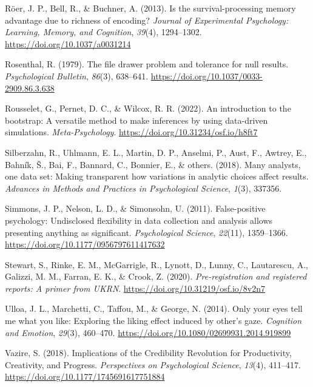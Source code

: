 \documentclass[
  man]{apa7}
\newlength{\cslhangindent}
\newlength{\cslentryspacingunit} %
\newenvironment{CSLReferences}[2] %
 {%
  \setlength{\parindent}{0pt}
  \ifodd #1
  \let\oldpar\par
  \def\par{\hangindent=\cslhangindent\oldpar}
  \fi
  \setlength{\parskip}{#2\cslentryspacingunit}
 }%
 {}
\begin{document}
\begin{CSLReferences}{1}{0}
\leavevmode{}%
Röer, J. P., Bell, R., \& Buchner, A. (2013). Is the survival-processing memory advantage due to richness of encoding? \emph{Journal of Experimental Psychology: Learning, Memory, and Cognition}, \emph{39}(4), 1294--1302. \url{https://doi.org/10.1037/a0031214}

\leavevmode{}%
Rosenthal, R. (1979). The file drawer problem and tolerance for null results. \emph{Psychological Bulletin}, \emph{86}(3), 638--641. \url{https://doi.org/10.1037/0033-2909.86.3.638}

\leavevmode{}%
Rousselet, G., Pernet, D. C., \& Wilcox, R. R. (2022). An introduction to the bootstrap: A versatile method to make inferences by using data-driven simulations. \emph{Meta-Psychology}. \url{https://doi.org/10.31234/osf.io/h8ft7}

\leavevmode{}%
Silberzahn, R., Uhlmann, E. L., Martin, D. P., Anselmi, P., Aust, F., Awtrey, E., Bahník, Š., Bai, F., Bannard, C., Bonnier, E., \& others. (2018). Many analysts, one data set: Making transparent how variations in analytic choices affect results. \emph{Advances in Methods and Practices in Psychological Science}, \emph{1}(3), 337356.

\leavevmode{}%
Simmons, J. P., Nelson, L. D., \& Simonsohn, U. (2011). False-positive psychology: Undisclosed flexibility in data collection and analysis allows presenting anything as significant. \emph{Psychological Science}, \emph{22}(11), 1359--1366. \url{https://doi.org/10.1177/0956797611417632}

\leavevmode{}%
Stewart, S., Rinke, E. M., McGarrigle, R., Lynott, D., Lunny, C., Lautarescu, A., Galizzi, M. M., Farran, E. K., \& Crook, Z. (2020). \emph{Pre-registration and registered reports: A primer from UKRN}. \url{https://doi.org/10.31219/osf.io/8v2n7}

\leavevmode{}%
Ulloa, J. L., Marchetti, C., Taffou, M., \& George, N. (2014). Only your eyes tell me what you like: Exploring the liking effect induced by other's gaze. \emph{Cognition and Emotion}, \emph{29}(3), 460--470. \url{https://doi.org/10.1080/02699931.2014.919899}

\leavevmode{}%
Vazire, S. (2018). Implications of the Credibility Revolution for Productivity, Creativity, and Progress. \emph{Perspectives on Psychological Science}, \emph{13}(4), 411--417. \url{https://doi.org/10.1177/1745691617751884}

\end{CSLReferences}

\endgroup
\end{document}
